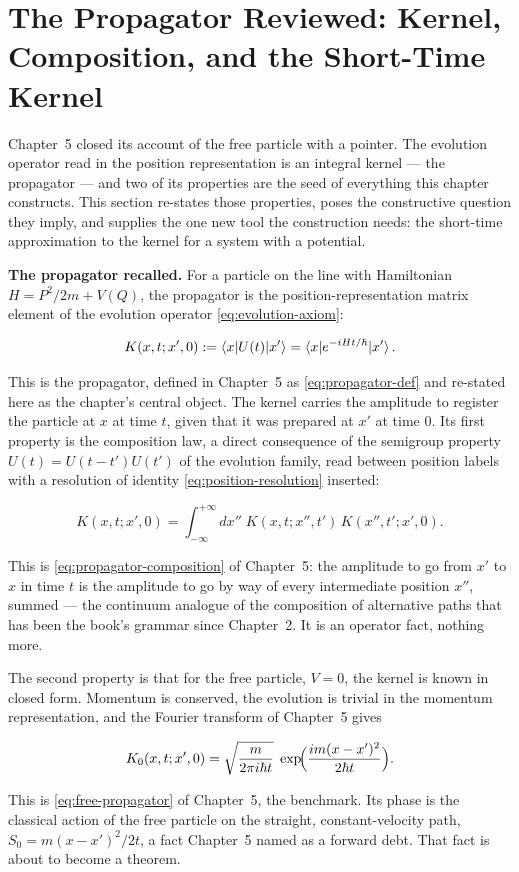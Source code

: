 \section{The Propagator Reviewed: Kernel, Composition, and the Short-Time Kernel}
\label{sec:propagator-review}

Chapter~5 closed its account of the free particle with a pointer. The evolution operator read in the position representation is an integral kernel --- the propagator --- and two of its properties are the seed of everything this chapter constructs. This section re-states those properties, poses the constructive question they imply, and supplies the one new tool the construction needs: the short-time approximation to the kernel for a system with a potential.

\medskip\noindent\textbf{The propagator recalled.} For a particle on the line with Hamiltonian $H = P^2/2m + V(Q)$, the propagator is the position-representation matrix element of the evolution operator \eqref{eq:evolution-axiom}:
\begin{linenomath}
\begin{equation}
K(x,t;x',0) := \braket{x|U(t)|x'} = \braket{x|e^{-iHt/\hbar}|x'} .
\end{equation}
\end{linenomath}
This is the propagator, defined in Chapter~5 as \eqref{eq:propagator-def} and re-stated here as the chapter's central object. The kernel carries the amplitude to register the particle at $x$ at time $t$, given that it was prepared at $x'$ at time $0$. Its first property is the composition law, a direct consequence of the semigroup property $U(t) = U(t - t')U(t')$ of the evolution family, read between position labels with a resolution of identity \eqref{eq:position-resolution} inserted:
\begin{linenomath}
\begin{equation}
K(x,t;x',0) = \int_{-\infty}^{+\infty} dx''\; K(x,t;x'',t')\,K(x'',t';x',0) .
\end{equation}
\end{linenomath}
This is \eqref{eq:propagator-composition} of Chapter~5: the amplitude to go from $x'$ to $x$ in time $t$ is the amplitude to go by way of every intermediate position $x''$, summed --- the continuum analogue of the composition of alternative paths that has been the book's grammar since Chapter~2. It is an operator fact, nothing more.

The second property is that for the free particle, $V = 0$, the kernel is known in closed form. Momentum is conserved, the evolution is trivial in the momentum representation, and the Fourier transform of Chapter~5 gives
\begin{linenomath}
\begin{equation}
K_0(x,t;x',0) = \sqrt{\frac{m}{2\pi i\hbar t}}\;\exp\!\Bigl(\frac{im(x-x')^2}{2\hbar t}\Bigr) .
\end{equation}
\end{linenomath}
This is \eqref{eq:free-propagator} of Chapter~5, the benchmark. Its phase is the classical action of the free particle on the straight, constant-velocity path, $S_0 = m(x-x')^2/2t$, a fact Chapter~5 named as a forward debt. That fact is about to become a theorem.

